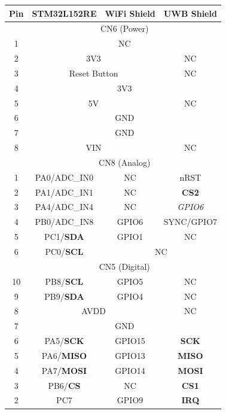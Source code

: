 \documentclass[journal,comsoc]{IEEEtran}
\begin{document}
\begin{table} [h!]
	\centering
	\begin{tabular}{|c|c|c|c|}\hline
	\textbf{Pin} & \textbf{STM32L152RE} & \textbf{WiFi Shield} & \textbf{UWB Shield} \\ \hline\hline
	  & \multicolumn{3}{c|}{CN6 (Power)} \\ \cline{2-4}
	1 & \multicolumn{3}{c|}{NC} \\ \cline{2-4}
	2 & \multicolumn{2}{c|}{3V3} & NC \\ \cline{2-4}
	3 & \multicolumn{2}{c|}{Reset Button} & NC \\ \cline{2-4}
	4 & \multicolumn{3}{c|}{3V3} \\ \cline{2-4}
	5 & \multicolumn{2}{c|}{5V} & NC \\ \cline{2-4}
	6 & \multicolumn{3}{c|}{GND} \\ \cline{2-4}
	7 & \multicolumn{3}{c|}{GND} \\ \cline{2-4}
	8 & \multicolumn{2}{c|}{VIN} & NC \\ \hline\hline
	  & \multicolumn{3}{c|}{CN8 (Analog)} \\ \cline{2-4}
	1 & PA0/ADC\_IN0 & NC & nRST \\ \cline{2-4}
	2 & PA1/ADC\_IN1 & NC & \textbf{CS2} \\ \cline{2-4}
	3 & PA4/ADC\_IN4 & NC & \textit{GPIO6} \\ \cline{2-4}
	4 & PB0/ADC\_IN8 & GPIO6 & SYNC/GPIO7 \\ \cline{2-4}
	5 & PC1/\textbf{SDA} & GPIO1 & NC \\ \cline{2-4}
	6 & PC0/\textbf{SCL} & \multicolumn{2}{c|}{NC} \\ \hline\hline
	  & \multicolumn{3}{c|}{CN5 (Digital)} \\ \cline{2-4}
	10 & PB8/\textbf{SCL} & GPIO5 & NC \\ \cline{2-4}
	9 & PB9/\textbf{SDA} & GPIO4 & NC \\ \cline{2-4}
	8 & \multicolumn{2}{c|}{AVDD} & NC \\ \cline{2-4}
	7 & \multicolumn{3}{c|}{GND} \\ \cline{2-4}
	6 & PA5/\textbf{SCK} & GPIO15 & \textbf{SCK} \\ \cline{2-4}
	5 & PA6/\textbf{MISO} & GPIO13 & \textbf{MISO} \\ \cline{2-4}
	4 & PA7/\textbf{MOSI} & GPIO14 & \textbf{MOSI} \\ \cline{2-4}
	3 & PB6/\textbf{CS} & NC & \textbf{CS1} \\ \cline{2-4}
	2 & PC7 & GPIO9 & \textbf{IRQ} \\ \cline{2-4}

\end{tabular}
\end{table}
\end{document}
